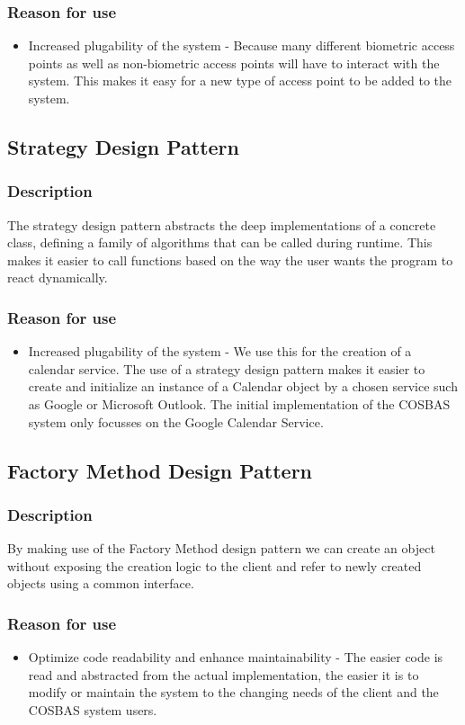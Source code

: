 	\subsubsection{Reason for use}
	\begin{itemize}
		\item{Increased plugability of the system} - Because many different biometric access points as well as non-biometric access points will have to interact with the system. This makes it easy for a new type of access point to be added to the system.
	\end{itemize}
	
\subsection{Strategy Design Pattern}
	\subsubsection{Description}
	The strategy design pattern abstracts the deep implementations of a concrete class, defining a family of algorithms that can be called during runtime. This makes it easier to call functions based on the way the user wants the program to react dynamically.
	
	
	\subsubsection{Reason for use}
	\begin{itemize}
		\item{Increased plugability of the system} - We use this for the creation of a calendar service. The use of a strategy design pattern makes it easier to create and initialize an instance of a Calendar object by a chosen service such as Google or Microsoft Outlook. The initial implementation of the COSBAS system only focusses on the Google Calendar Service.
	\end{itemize}
	
\subsection{Factory Method Design Pattern}
	\subsubsection{Description}
	By making use of the Factory Method design pattern we can create an object without exposing the creation logic to the client and refer to newly created objects using a common interface.
	
	\subsubsection{Reason for use}
	\begin{itemize}
		\item{Optimize code readability and enhance maintainability} - The easier code is read and abstracted from the actual implementation, the easier it is to modify or maintain the system to the changing needs of the client and the COSBAS system users. 
	\end{itemize}